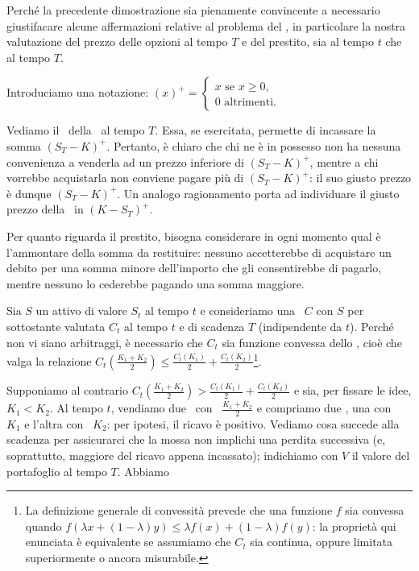 \par Perch\'e la precedente dimostrazione sia pienamente convincente a necessario giustifacare alcune affermazioni relative al problema del \Pricing, in particolare la nostra valutazione del prezzo delle opzioni al tempo $T$ e del prestito, sia al tempo $t$ che al tempo $T$.
\par Introduciamo una notazione: $(x)^+ = \begin{cases} x \text{ se } x \geq 0,\\ 0 \text{ altrimenti}.\end{cases}$
\par Vediamo il \Pricing\ della \Call\ al tempo $T$. Essa, se esercitata, permette di incassare la somma $(S_T - K)^+$. Pertanto, \`e chiaro che chi ne \`e in possesso non ha nessuna convenienza a venderla ad un prezzo inferiore di $(S_T - K)^+$, mentre a chi vorrebbe acquistarla non conviene pagare pi\`u di $(S_T - K)^+$: il suo giusto prezzo \`e dunque $(S_T - K)^+$. Un analogo ragionamento porta ad individuare il giusto prezzo della \Put\ in $(K - S_T)^+$.
\par Per quanto riguarda il prestito, bisogna considerare in ogni momento qual \`e l'ammontare della somma da restituire: nessuno accetterebbe di acquistare un debito per una somma minore dell'importo che gli consentirebbe di pagarlo, mentre nessuno lo cederebbe pagando una somma maggiore.
\begin{Theorem}
	 Sia $S$ un attivo di valore $S_t$ al tempo $t$ e consideriamo una \Call\ $C$ con $S$ per sottostante valutata $C_t$ al tempo $t$ e di scadenza $T$ (indipendente da $t$). Perch\'e non vi siano arbitraggi, \`e necessario che $C_t$ sia funzione convessa dello \Strike, cio\`e che valga la relazione $C_t \left (\frac{K_1 + K_2}{2} \right ) \leq \frac{C_t(K_1)}{2} + \frac{C_t(K_2)}{2}$\footnote{La definizione generale di convessit\`a prevede che una funzione $f$ sia convessa quando $f(\lambda x + (1 - \lambda) y) \leq \lambda f(x) + (1 - \lambda)f(y)$: la propriet\`a qui enunciata \`e equivalente se assumiamo che $C_t$ sia continua, oppure limitata superiormente o ancora misurabile.}.
\end{Theorem}
\Proof Supponiamo al contrario $C_t \left (\frac{K_1 + K_2}{2} \right ) > \frac{C_t(K_1)}{2} + \frac{C_t(K_2)}{2}$ e sia, per fissare le idee, $K_1 < K_2$. Al tempo $t$, vendiamo due \Call\ con \Strike\ $\frac{K_1 + K_2}{2}$ e compriamo due \Call, una con \Strike\ $K_1$ e l'altra con \Strike\ $K_2$: per ipotesi, il ricavo \`e positivo. Vediamo cosa succede alla scadenza per assicurarci che la mossa non implichi una perdita successiva (e, soprattutto, maggiore del ricavo appena incassato); indichiamo con $V$ il valore del portafoglio al tempo $T$. Abbiamo
